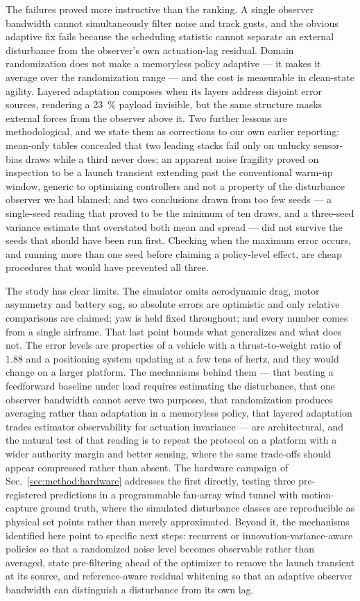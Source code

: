 The failures proved more instructive than the ranking. A single observer bandwidth
cannot simultaneously filter noise and track gusts, and the obvious adaptive fix fails
because the scheduling statistic cannot separate an external disturbance from the
observer's own actuation-lag residual. Domain randomization does not make a memoryless
policy adaptive --- it makes it average over the randomization range --- and the cost is
measurable in clean-state agility. Layered adaptation composes when its layers address
disjoint error sources, rendering a \SI{23}{\percent} payload invisible, but the same
structure masks external forces from the observer above it. Two further lessons are
methodological, and we state them as corrections to our own earlier reporting: mean-only
tables concealed that two leading stacks fail only on unlucky sensor-bias draws while a
third never does; an apparent noise fragility proved on inspection to be a launch
transient extending past the conventional warm-up window, generic to optimizing
controllers and not a property of the disturbance observer we had blamed; and two
conclusions drawn from too few seeds --- a single-seed reading that proved to be the
minimum of ten draws, and a three-seed variance estimate that overstated both mean and
spread --- did not survive the seeds that should have been run first. Checking when the
maximum error occurs, and running more than one seed before claiming a policy-level
effect, are cheap procedures that would have prevented all three.

The study has clear limits. The simulator omits aerodynamic drag, motor asymmetry and
battery sag, so absolute errors are optimistic and only relative comparisons are
claimed; yaw is held fixed throughout; and every number comes from a single airframe.
That last point bounds what generalizes and what does not. The error levels are
properties of a vehicle with a thrust-to-weight ratio of $1.88$ and a positioning system
updating at a few tens of hertz, and they would change on a larger platform. The
mechanisms behind them --- that beating a feedforward baseline under load requires
estimating the disturbance, that one observer bandwidth cannot serve two purposes, that
randomization produces averaging rather than adaptation in a memoryless policy, that
layered adaptation trades estimator observability for actuation invariance --- are
architectural, and the natural test of that reading is to repeat the protocol on a
platform with a wider authority margin and better sensing, where the same trade-offs
should appear compressed rather than absent. The hardware
campaign of Sec.~\ref{sec:method:hardware} addresses the first directly, testing three
pre-registered predictions in a programmable fan-array wind tunnel with motion-capture
ground truth, where the simulated disturbance classes are reproducible as physical set
points rather than merely approximated. Beyond it, the mechanisms identified here point
to specific next steps: recurrent or innovation-variance-aware policies so that a
randomized noise level becomes observable rather than averaged, state pre-filtering ahead
of the optimizer to remove the launch transient at its source, and reference-aware
residual whitening so that an adaptive observer bandwidth can distinguish a disturbance
from its own lag.
